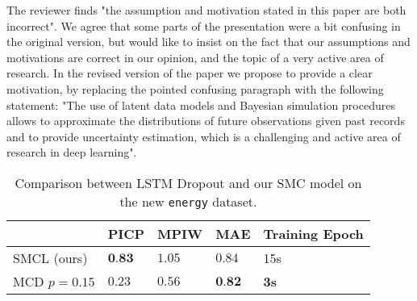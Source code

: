 \documentclass{article}
\begin{document}
The reviewer finds "the assumption and motivation stated in this paper are both incorrect".
We agree that some parts of the presentation were a bit confusing in the original version, but would like to insist on the fact that our assumptions and motivations are correct in our opinion, and the topic of a very active area of research.
In the revised version of the paper we propose to provide a clear motivation, by replacing the pointed confusing paragraph with the following statement: "The use of latent data models and Bayesian simulation procedures allows to approximate the distributions of future observations given past records and to provide uncertainty estimation, which is a challenging and active area of research in deep learning".

\begin{table}[htpb]
	\centering
	\caption{Comparison between LSTM Dropout and our SMC model on the new \texttt{energy} dataset.}
	\label{tab:comparison}
	\begin{tabular}{lllll}
		\toprule
		             & PICP            & MPIW    & MAE             & Training Epoch \\
		\toprule
		SMCL (ours)  & $\textbf{0.83}$ & $1.05$ & $0.84$          & 15s            \\
		MCD $p=0.15$ & $0.23$          & $0.56$  & $\textbf{0.82}$ & \textbf{3s}    \\
		\bottomrule
	\end{tabular}
\end{table}



\end{document}
